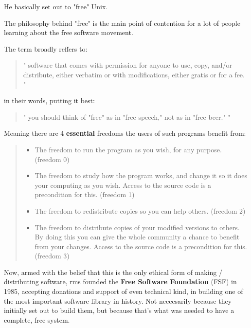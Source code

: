 \documentclass[sigplan,screen]{acmart}
\begin{document}
He basically set out to "free" Unix.

The philosophy behind "free" is the main point of contention for a lot of people learning about the free software movement.

The term broadly reffers to:

\begin{quote}
	"
	software that comes with permission for anyone to use, copy, and/or distribute, either verbatim or with modifications, either gratis or for a fee.
	"
\end{quote}

in their words, putting it best:
\begin{quote}
	"
	you should think of "free" as in "free speech," not as in "free beer."
	"
\end{quote}

Meaning there are 4 \textbf{essential} freedoms the users of such programs benefit from: \label{freedoms}
\begin{quotation}
	\begin{itemize}
		\item 	The freedom to run the program as you wish, for any purpose. (freedom 0)
		\item 	The freedom to study how the program works, and change it so it does your computing as you wish. Access to the source code is a precondition for this. (freedom 1)
		\item  	The freedom to redistribute copies so you can help others. (freedom 2)
		\item  	The freedom to distribute copies of your modified versions to others. By doing this you can give the whole community a chance to benefit from your changes. Access to the source code is a precondition for this. (freedom 3)
	\end{itemize}
\end{quotation}

Now, armed with the belief that this is the only ethical form of making / distributing software, rms founded the \textbf{Free Software Foundation} (FSF) in 1985, accepting donations and support of even technical kind, in building one of the most important software library in history. Not neccesarily because they initially set out to build them, but because that's what was needed to have a complete, free system. \cite{gnu-and-linux}
\end{document}
